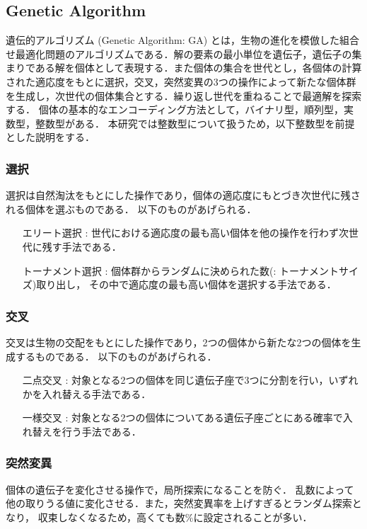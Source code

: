 \changeindent{0cm}
\subsection{Genetic Algorithm}
\changeindent{2cm}
遺伝的アルゴリズム (Genetic Algorithm: GA)\cite{whitley1994genetic} とは，生物の進化を模倣した組合せ最適化問題のアルゴリズムである．解の要素の最小単位を遺伝子，遺伝子の集まりである解を個体として表現する．また個体の集合を世代とし，各個体の計算された適応度をもとに選択，交叉，突然変異の3つの操作によって新たな個体群を生成し，次世代の個体集合とする．繰り返し世代を重ねることで最適解を探索する．
個体の基本的なエンコーディング方法として，バイナリ型，順列型，実数型，整数型がある．
本研究では整数型について扱うため，以下整数型を前提とした説明をする．

\changeindent{0cm}
\subsubsection{選択}
\changeindent{2cm}
選択\cite{blickle1996comparison}は自然淘汰をもとにした操作であり，個体の適応度にもとづき次世代に残される個体を選ぶものである．
以下のものがあげられる．
\begin{itemize}
	\setlength{\leftskip}{4.5cm}
	\item[エリート選択\cite{murata1996multi} : ]世代における適応度の最も高い個体を他の操作を行わず次世代に残す手法である．
	\item[トーナメント選択 : ]個体群からランダムに決められた数(: トーナメントサイズ)取り出し，
	その中で適応度の最も高い個体を選択する手法である．
\end{itemize}

\changeindent{0cm}
\subsubsection{交叉}
\changeindent{2cm}
交叉は生物の交配をもとにした操作であり，2つの個体から新たな2つの個体を生成するものである．
以下のものがあげられる．
\begin{itemize}
	\setlength{\leftskip}{3cm}
	\item[二点交叉 : ]対象となる2つの個体を同じ遺伝子座で3つに分割を行い，いずれかを入れ替える手法である．
	\item[一様交叉 : ]対象となる2つの個体についてある遺伝子座ごとにある確率で入れ替えを行う手法である．
\end{itemize}

\changeindent{0cm}
\subsubsection{突然変異}
\changeindent{2cm}
個体の遺伝子を変化させる操作で，局所探索になることを防ぐ．
乱数によって他の取りうる値に変化させる．また，突然変異率を上げすぎるとランダム探索となり，
収束しなくなるため，高くても数\%に設定されることが多い．




